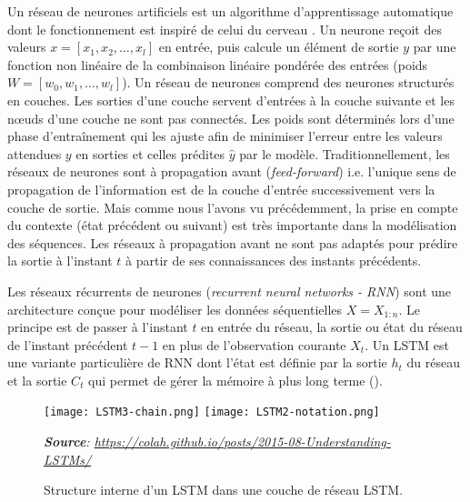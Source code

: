 Un réseau de neurones artificiels est un algorithme d'apprentissage automatique dont le fonctionnement est inspiré de celui du cerveau \citep{mcculloch1943nervousactivity,rosenblatt1958perceptron}. Un neurone reçoit des valeurs $x = [x_1, x_2, \dots, x_l]$ en entrée, puis calcule un élément de sortie $y$ par une fonction non linéaire de la combinaison linéaire pondérée  des entrées (poids $W = [w_0, w_1, \dots, w_l]$).
Un réseau de neurones comprend des neurones structurés en couches. Les sorties d'une couche servent d'entrées à la couche suivante et les n\oe{}uds d'une couche ne sont pas connectés. Les poids sont déterminés lors d'une phase d'entraînement qui les ajuste afin de minimiser l'erreur entre les valeurs attendues $y$ en sorties et celles prédites $\hat{y}$ par le modèle.
Traditionnellement, les réseaux de neurones sont à \og propagation avant \fg{} (\textit{feed-forward}) i.e. l'unique sens de propagation de l'information est de la couche d'entrée successivement vers la couche de sortie. Mais comme nous l'avons vu précédemment, la prise en compte du contexte (état précédent ou suivant) est très importante dans la modélisation des séquences. Les réseaux à propagation avant ne sont pas adaptés pour prédire la sortie à l'instant $t$ à partir de ses connaissances des instants précédents.

Les réseaux récurrents de neurones (\textit{recurrent neural networks - RNN}) \citep{jordan1986serialorder_rnn,elman1990findingstructure_rnn} sont une architecture conçue pour modéliser les données séquentielles $X = X_{1:n}$. Le principe est de passer à l'instant $t$ en entrée du réseau, la sortie ou état du réseau de l'instant précédent $t-1$ en plus de l'observation courante $X_t$. Un LSTM \citep{Hochreiter1997LSTM} est une variante particulière de RNN dont l'état est définie par la sortie $h_t$ du réseau et la sortie $C_t$ qui permet de gérer la mémoire à plus long terme  (). 

\begin{figure}[!htb]
	\centering \texttt{[image: LSTM3-chain.png]}
	\texttt{[image: LSTM2-notation.png]}
	
\textit{\scriptsize{\textbf{Source}: \url{https://colah.github.io/posts/2015-08-Understanding-LSTMs/}}}
	\caption{Structure interne d'un LSTM dans une couche de réseau LSTM.}\label{fig:structuration:couchedelstm}
\end{figure}



